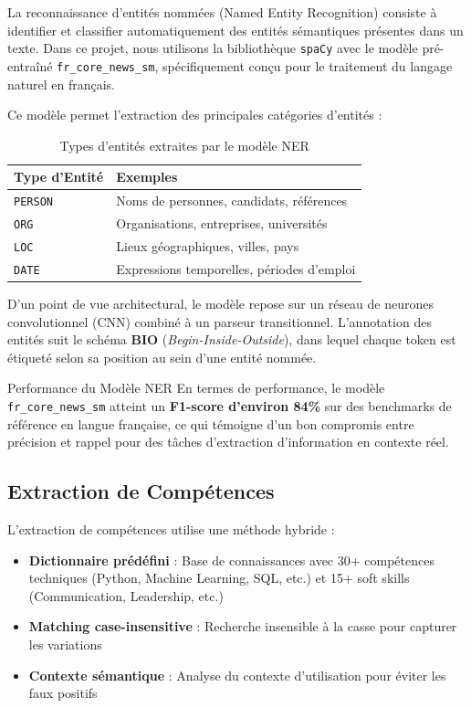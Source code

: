\documentclass{rapportECL}
\begin{document}
La reconnaissance d'entités nommées (Named Entity Recognition) consiste à identifier et classifier automatiquement des entités sémantiques présentes dans un texte. Dans ce projet, nous utilisons la bibliothèque \texttt{spaCy} avec le modèle pré-entraîné \texttt{fr\_core\_news\_sm}, spécifiquement conçu pour le traitement du langage naturel en français.

Ce modèle permet l'extraction des principales catégories d'entités :

\begin{table}[H]
\centering
\begin{tabular}{ll}
\toprule
\textbf{Type d'Entité} & \textbf{Exemples} \\
\midrule
\texttt{PERSON} & Noms de personnes, candidats, références \\
\texttt{ORG} & Organisations, entreprises, universités \\
\texttt{LOC} & Lieux géographiques, villes, pays \\
\texttt{DATE} & Expressions temporelles, périodes d'emploi \\
\bottomrule
\end{tabular}
\caption{Types d'entités extraites par le modèle NER}
\label{tab:ner_entities}
\end{table}

D'un point de vue architectural, le modèle repose sur un réseau de neurones convolutionnel (CNN) combiné à un parseur transitionnel. L'annotation des entités suit le schéma \textbf{BIO} (\textit{Begin-Inside-Outside}), dans lequel chaque token est étiqueté selon sa position au sein d'une entité nommée.

\begin{infobox}{Performance du Modèle NER}
En termes de performance, le modèle \texttt{fr\_core\_news\_sm} atteint un \textbf{F1-score d'environ 84\%} sur des benchmarks de référence en langue française, ce qui témoigne d'un bon compromis entre précision et rappel pour des tâches d'extraction d'information en contexte réel.
\end{infobox}

\subsection{Extraction de Compétences}

L'extraction de compétences utilise une méthode hybride :

\begin{itemize}[leftmargin=*]
    \item \textbf{Dictionnaire prédéfini} : Base de connaissances avec 30+ compétences techniques (Python, Machine Learning, SQL, etc.) et 15+ soft skills (Communication, Leadership, etc.)
    \item \textbf{Matching case-insensitive} : Recherche insensible à la casse pour capturer les variations
    \item \textbf{Contexte sémantique} : Analyse du contexte d'utilisation pour éviter les faux positifs
\end{itemize}
\end{document}
